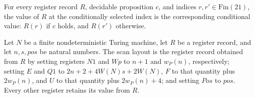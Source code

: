 \begin{lemma}
\label{Complexity.Codec.Regs.val_ite}
\leanok
{}
For every register record $R$, decidable proposition $c$, and indices $r,r\prime\in\mathrm{Fin}(21)$,
the value of $R$ at the conditionally selected index is the corresponding conditional
value: $R(r)$ if $c$ holds, and $R(r\prime)$ otherwise.
\end{lemma}

\begin{definition}
\label{Complexity.Codec.layR}
\leanok
{}
Let $N$ be a finite nondeterministic Turing machine, let $R$ be a register record, and
let $n,s,pos$ be natural numbers. The scan layout is the register record obtained from
$R$ by setting registers $N1$ and $Wp$ to $n+1$ and $w_P(n)$, respectively; setting $E$
and $Q1$ to $2n+2+4W(N)s+2W(N)$, $F$ to that quantity plus $2w_P(n)$, and $U$ to that
quantity plus $2w_P(n)+4$; and setting $Pos$ to $pos$. Every other register retains its
value from $R$.
\end{definition}

